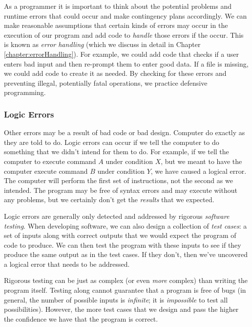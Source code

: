 As a programmer it is important to think about the potential problems and
runtime errors that could occur and make contingency plans accordingly.
We can make reasonable assumptions that certain kinds of errors may 
occur in the execution of our program and add code to \emph{handle} 
those errors if the occur.  This is known as \emph{error handling} (which
we discuss in detail in Chapter \ref{chapter:errorHandling}).  For
example, we could add code that checks if a user enters bad input and
then re-prompt them to enter good data.  If a file is missing, we could add
code to create it as needed.  By checking for these errors and preventing
illegal, potentially fatal operations, we practice \gls{defensive programming}.

\subsubsection{Logic Errors}

Other errors may be a result of bad code or bad design.  Computer do 
exactly as they are told to do.  Logic errors can occur if we tell the
computer to do something that we didn't intend for them to do.  For example, 
if we tell the computer to execute command $A$ under condition $X$, but
we meant to have the computer execute command $B$ under condition $Y$, 
we have caused a logical error.  The computer will perform the first set of 
instructions, not the second as we intended.  The program may be free of
syntax errors and may execute without any problems, but we certainly don't
get the \emph{results} that we expected.  

Logic errors are generally only detected and addressed by rigorous 
\emph{software testing}.  When developing software, we can also
design a collection of \emph{test cases}: a set of inputs along with
correct outputs that we would expect the program of code to produce.
We can then test the program with these inputs to see if they produce
the same output as in the test cases.  If they don't, then we've uncovered
a logical error that needs to be addressed.

Rigorous testing can be just as complex (or even \emph{more} complex) 
than writing the program itself.  Testing along cannot guarantee that a
program is free of bugs (in general, the number of possible inputs is
\emph{infinite}; it is \emph{impossible} to test all possibilities).  However, 
the more test cases that we design and pass the higher the confidence 
we have that the program is correct.

